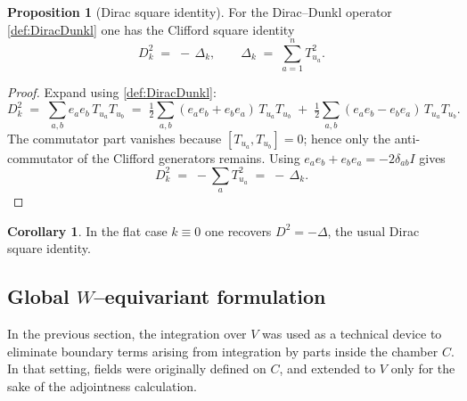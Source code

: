 \documentclass[12pt]{article}
\newcommand{\1}{\mathbbm{1}}
\theoremstyle{definition}
\newtheorem{proposition}{Proposition}
\newtheorem{corollary}{Corollary}
\begin{document}
\begin{proposition}[Dirac square identity]\label{thm:DiracSquare}
For the Dirac--Dunkl operator \eqref{def:DiracDunkl} one has the Clifford square identity
\begin{equation}\label{eq:DkSquare}
  D_{k}^{2} \;=\; -\,\Delta_{k},\qquad
  \Delta_{k} \;=\; \sum_{a=1}^{n} T_{u_{a}}^{2}.
\end{equation}
\end{proposition}

\begin{proof}
Expand using \eqref{def:DiracDunkl}:
\[
  D_{k}^{2}
  \;=\; \sum_{a,b} e_{a} e_{b}\, T_{u_{a}} T_{u_{b}}
  \;=\; \tfrac{1}{2}\sum_{a,b} (e_{a} e_{b}+e_{b} e_{a})\, T_{u_{a}} T_{u_{b}}
        \;+\; \tfrac{1}{2}\sum_{a,b} (e_{a} e_{b}-e_{b} e_{a})\, T_{u_{a}} T_{u_{b}}.
\]
The commutator part vanishes because $[T_{u_{a}},T_{u_{b}}]=0$; hence only the
anti-commutator of the Clifford generators remains. Using
$e_{a}e_{b}+e_{b}e_{a}=-2\delta_{ab} I$ gives
\[
  D_{k}^{2} \;=\; -\sum_{a} T_{u_{a}}^{2} \;=\; -\,\Delta_{k}.
\]
\end{proof}

\begin{corollary}
In the flat case $k\equiv 0$ one recovers $D^{2}=-\Delta$, the usual Dirac square identity.
\end{corollary}




\subsection{Global $W$--equivariant formulation}

In the previous section, the integration over $V$ was used as a
{technical device} to eliminate boundary terms arising from
integration by parts inside the chamber $C$. In that setting, fields
were originally defined on $C$, and extended to $V$ only for the sake
of the adjointness calculation.
\end{document}
